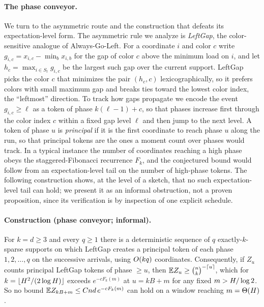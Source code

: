 \paragraph{The phase conveyor.}
We turn to the asymmetric route and the construction that defeats its expectation-level form. The asymmetric rule we analyze
is \emph{LeftGap}, the color-sensitive analogue of Always-Go-Left. For a coordinate $i$ and color $c$ write
$g_{i,c}=x_{i,c}-\min_b x_{i,b}$ for the gap of color $c$ above the minimum load on $i$, and let $h_c=\max_{i\in S_t}g_{i,c}$
be the largest such gap over the current support. LeftGap picks the color $c$ that minimizes the pair $(h_c,c)$
lexicographically, so it prefers colors with small maximum gap and breaks ties toward the lowest color index, the
``leftmost'' direction. To track how gaps propagate we encode the event $g_{i,c}\ge\ell$ as a token of phase
$k(\ell-1)+c$, so that phases increase first through the color index $c$ within a fixed gap level $\ell$ and then jump to the
next level. A token of phase $u$ is \emph{principal} if it is the first coordinate to reach phase $u$ along the run, so that
principal tokens are the ones a moment count over phases would track. In a typical instance the number of coordinates
reaching a high phase obeys the staggered-Fibonacci recurrence $F_k$, and the conjectured bound would follow from an
expectation-level tail on the number of high-phase tokens. The following construction shows, at the level of a sketch, that
no such expectation-level tail can hold; we present it as an informal obstruction, not a proven proposition, since its
verification is by inspection of one explicit schedule.

\paragraph{Construction (phase conveyor; informal).}
For $k=d\ge3$ and every $q\ge1$ there is a deterministic sequence of $q$ exactly-$k$-sparse supports on which LeftGap creates
a principal token of each phase $1,2,\dots,q$ on the successive arrivals, using $O(kq)$ coordinates. Consequently, if
$Z_u$ counts principal LeftGap tokens of phase $\ge u$, then $\mathbb{E} Z_u\ge\binom nk^{-\lceil u\rceil}$, which for
$k=\lfloor H^2/(2\log H)\rfloor$ exceeds $e^{-cF_k(m)}$ at $u=kB+m$ for any fixed $m>H/\log2$. So no bound
$\mathbb{E} Z_{kB+m}\le Cnd\,e^{-cF_k(m)}$ can hold on a window reaching $m=\Theta(H)$.

